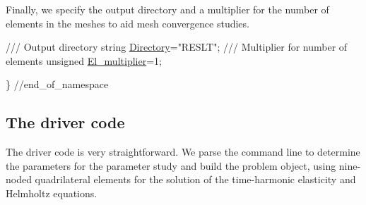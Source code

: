Finally, we specify the output directory and a multiplier for the number of elements in the meshes to aid mesh convergence studies.


\begin{DoxyCodeInclude}

\textcolor{comment}{}
\textcolor{comment}{ /// Output directory}
\textcolor{comment}{} \textcolor{keywordtype}{string} \hyperlink{namespaceGlobal__Parameters_a301ab922df72030c660b21328d6caf76}{Directory}=\textcolor{stringliteral}{"RESLT"};
 \textcolor{comment}{}
\textcolor{comment}{ /// Multiplier for number of elements}
\textcolor{comment}{} \textcolor{keywordtype}{unsigned} \hyperlink{namespaceGlobal__Parameters_a35d5d2ecfff0cec6150a5dc79e5c1ad1}{El\_multiplier}=1;

\} \textcolor{comment}{//end\_of\_namespace}

\end{DoxyCodeInclude}




 

\hypertarget{index_main}{}\subsection{The driver code}\label{index_main}
The driver code is very straightforward. We parse the command line to determine the parameters for the parameter study and build the problem object, using nine-\/noded quadrilateral elements for the solution of the time-\/harmonic elasticity and Helmholtz equations.

